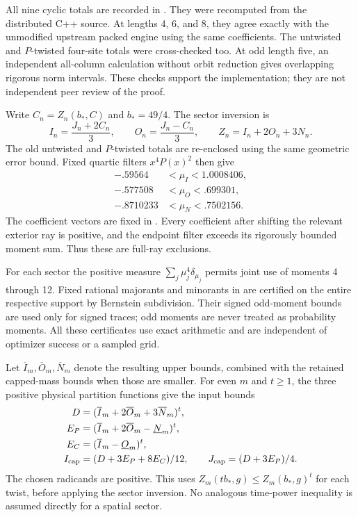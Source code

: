 All nine cyclic totals are recorded in
.
They were recomputed from the distributed C++ source. At lengths
4, 6, and 8, they agree exactly with the unmodified upstream packed
engine using the same coefficients. The untwisted and $P$-twisted
four-site totals were cross-checked too. At odd length five, an
independent all-column calculation without orbit reduction gives
overlapping rigorous norm intervals. These checks support the
implementation; they are not independent peer review of the proof.

Write $C_n=Z_n(b_*,C)$ and $b_*=49/4$. The sector inversion is
\[
 I_n=\frac{J_n+2C_n}{3},\qquad
 O_n=\frac{J_n-C_n}{3},\qquad
 Z_n=I_n+2O_n+3N_n.
\]
The old untwisted and $P$-twisted totals are re-enclosed using the same
geometric error bound. Fixed quartic filters $x^4P(x)^2$ then give
\begin{align*}
 -.59564&<\mu_I<1.0008406,\\
 -.577508&<\mu_O<.699301,\\
 -.8710233&<\mu_N<.7502156.
\end{align*}
The coefficient vectors are fixed in
. Every coefficient after shifting
the relevant exterior ray is positive, and the endpoint filter exceeds
its rigorously bounded moment sum. Thus these are full-ray exclusions.

For each sector the positive measure
$\sum_j\mu_j^4\delta_{\mu_j}$ permits joint use of moments 4 through 12.
Fixed rational majorants and minorants in
are certified on the entire respective support by Bernstein subdivision.
Their signed odd-moment bounds are used only for signed traces;
odd moments are never treated as probability moments.
All these certificates use exact arithmetic and are independent of
optimizer success or a sampled grid.

Let $\overline I_m,\overline O_m,\overline N_m$ denote the resulting
upper bounds, combined with the retained capped-mass bounds when
those are smaller. For even $m$ and $t\ge1$, the three positive
physical partition functions give the input bounds
\begin{align*}
 D&=(\overline I_m+2\overline O_m+3\overline N_m)^t,\\
 E_P&=(\overline I_m+2\overline O_m-\underline N_m)^t,\\
 E_C&=(\overline I_m-\underline O_m)^t,\\
 I_{\rm cap}&=(D+3E_P+8E_C)/12,\qquad
 J_{\rm cap}=(D+3E_P)/4.
\end{align*}
The chosen radicands are positive. This uses
$Z_m(tb_*,g)\le Z_m(b_*,g)^t$ for each twist, before applying
the sector inversion. No analogous time-power inequality is assumed
directly for a spatial sector.

